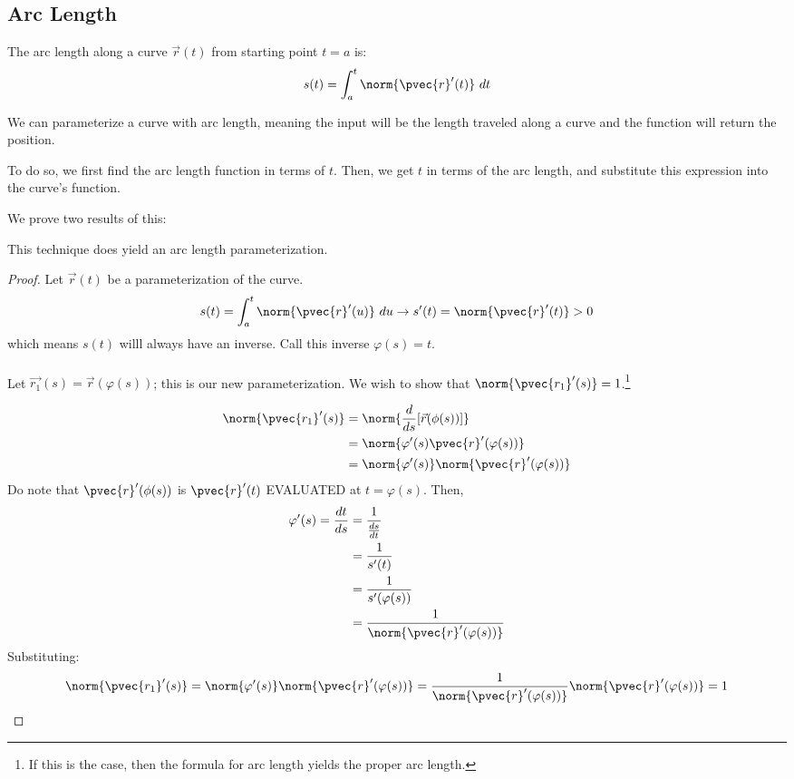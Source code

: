 \documentclass[12pt]{article}
\begin{document}
\subsection{Arc Length}
The arc length along a curve $\vec{r}(t)$ from starting point $t=a$ is:
\[ s(t) = \int_a^t{\norm{\pvec{r}'(t)} \ dt} \]

We can parameterize a curve with arc length, meaning the input will be the length traveled along a curve and the function will return the position. 

To do so, we first find the arc length function in terms of $t$. Then, we get $t$ in terms of the arc length, and substitute this expression into the curve's function. 

We prove two results of this:

\begin{theorem}
This technique does yield an arc length parameterization.
\end{theorem}

\begin{proof}
Let $\vec{r}(t)$ be a parameterization of the curve.
\[ s(t) = \int_a^t\norm{\pvec{r}'(u)} \ du \rightarrow s'(t) = \norm{\pvec{r}'(t)} > 0 \]
which means $s(t)$ willl always have an inverse. Call this inverse $\varphi(s) = t$. \\ \\
Let $\vec{r_1}(s) = \vec{r}(\varphi(s))$; this is our new parameterization. We wish to show that $\norm{\pvec{r_1}'(s)} = 1$.\footnote{If this is the case, then the formula for arc length yields the proper arc length.} 

\[
\begin{aligned}
\norm{\pvec{r_1}'(s)} &= \norm{\frac{d}{ds}{[}\vec{r}(\phi(s)){]}} \\
&= \norm{\varphi'(s)\pvec{r}'(\varphi(s))} \\
&= \norm{\varphi'(s)}\norm{\pvec{r}'(\varphi(s))}
\end{aligned}
\]
Do note that $\pvec{r}'(\phi(s))$ is $\pvec{r}'(t)$ EVALUATED at $t = \varphi(s)$. Then,
\[
\begin{aligned}
\varphi'(s) = \dfrac{dt}{ds} &= \frac{1}{\frac{ds}{dt}} \\
&= \frac{1}{s'(t)} \\
&= \frac{1}{s'(\varphi(s))} \\
&= \frac{1}{\norm{\pvec{r}'(\varphi(s))}}
\end{aligned}
\]
Substituting:
\[ \norm{\pvec{r_1}'(s)} = \norm{\varphi'(s)}\norm{\pvec{r}'(\varphi(s))} = \frac{1}{\norm{\pvec{r}'(\varphi(s))}} \norm{\pvec{r}'(\varphi(s))} = 1 \]
\end{proof}
\end{document}
